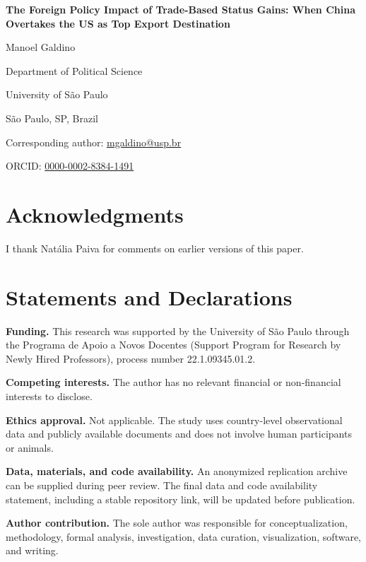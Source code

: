 \documentclass[11pt]{article}
\begin{document}
\thispagestyle{empty}

\begin{center}

{\Large\bfseries The Foreign Policy Impact of Trade-Based Status Gains: When China Overtakes the US as Top Export Destination\par}

\vspace{1.5cm}

{\large Manoel Galdino\par}

Department of Political Science\par

University of S\~{a}o Paulo\par

S\~{a}o Paulo, SP, Brazil\par

Corresponding author: \href{mailto:mgaldino@usp.br}{mgaldino@usp.br}\par

ORCID: \href{https://orcid.org/0000-0002-8384-1491}{0000-0002-8384-1491}\par

\end{center}

\section*{Acknowledgments}

I thank Nat\'{a}lia Paiva for comments on earlier versions of this paper.

\section*{Statements and Declarations}

\textbf{Funding.} This research was supported by the University of S\~{a}o Paulo through the Programa de Apoio a Novos Docentes (Support Program for Research by Newly Hired Professors), process number 22.1.09345.01.2.

\textbf{Competing interests.} The author has no relevant financial or non-financial interests to disclose.

\textbf{Ethics approval.} Not applicable. The study uses country-level observational data and publicly available documents and does not involve human participants or animals.

\textbf{Data, materials, and code availability.} An anonymized replication archive can be supplied during peer review. The final data and code availability statement, including a stable repository link, will be updated before publication.

\textbf{Author contribution.} The sole author was responsible for conceptualization, methodology, formal analysis, investigation, data curation, visualization, software, and writing.
\end{document}
